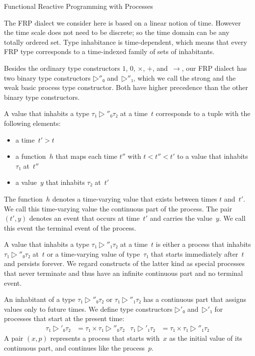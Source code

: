 \documentclass[copyright,creativecommons]{eptcs}
\begin{document}
           {Functional Reactive Programming with Processes}

The FRP dialect we consider here is based on a linear notion of time. However
the time scale does not need to be discrete; so the time domain can be any
totally ordered set. Type inhabitance is time-dependent, which means that every
FRP type corresponds to a time-indexed family of sets of inhabitants.

Besides the ordinary type constructors $1$, $0$, $×$, $+$, and~$→$, our FRP
dialect has two binary type constructors $▷″₀$ and~$▷″₁$, which we call the
strong and the weak basic process type constructor. Both have higher precedence
than the other binary type constructors.

A value that inhabits a type $τ₁ ▷″₀ τ₂$ at a time~$t$ corresponds to a tuple
with the following elements:
\begin{itemize}

\item

a time~$t′ > t$

\item

a function~$h$ that maps each time $t″$ with $t < t″ < t′$ to a value that
inhabits $τ₁$ at~$t″$

\item

a value~$y$ that inhabits $τ₂$ at~$t′$

\end{itemize}
The function~$h$ denotes a time-varying value that exists between times $t$
and~$t′$. We call this time-varying value the continuous part of the process.
The pair $(t′, y)$ denotes an event that occurs at time~$t′$ and carries the
value~$y$. We call this event the terminal event of the process.

A value that inhabits a type $τ₁ ▷″₁ τ₂$ at a time~$t$ is either a process that
inhabits $τ₁ ▷″₀ τ₂$ at~$t$ or a time-varying value of type~$τ₁$ that starts
immediately after~$t$ and persists forever. We regard constructs of the latter
kind as special processes that never terminate and thus have an infinite
continuous part and no terminal event.


An inhabitant of a type $τ₁ ▷″₀ τ₂$ or $τ₁ ▷″₁ τ₂$ has a continuous part that
assigns values only to future times. We define type constructors $▷′₀$ and~$▷′₁$
for processes that start at the present time:
\begin{align}
τ₁ ▷′₀ τ₂ & = τ₁ × τ₁ ▷″₀ τ₂ & τ₁ ▷′₁ τ₂ & = τ₁ × τ₁ ▷″₁ τ₂
\end{align}
A pair $(x, p)$ represents a process that starts with~$x$ as the initial value
of its continuous part, and continues like the process~$p$.
\end{document}
